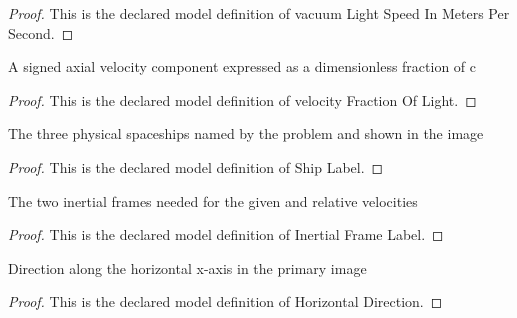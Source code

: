 \begin{proof}
  This is the declared model definition of vacuum Light Speed In Meters Per Second.
\end{proof}
\begin{definition}
  \label{def:physics:phyx-mini-0590:phyxminiproblems-problemphyxmini0590-velocityfractionoflight}
  A signed axial velocity component expressed as a dimensionless fraction of c
\end{definition}
\begin{proof}
  This is the declared model definition of velocity Fraction Of Light.
\end{proof}
\begin{definition}
  \label{def:physics:phyx-mini-0590:phyxminiproblems-problemphyxmini0590-shiplabel}
  The three physical spaceships named by the problem and shown in the image
\end{definition}
\begin{proof}
  This is the declared model definition of Ship Label.
\end{proof}
\begin{definition}
  \label{def:physics:phyx-mini-0590:phyxminiproblems-problemphyxmini0590-inertialframelabel}
  The two inertial frames needed for the given and relative velocities
\end{definition}
\begin{proof}
  This is the declared model definition of Inertial Frame Label.
\end{proof}
\begin{definition}
  \label{def:physics:phyx-mini-0590:phyxminiproblems-problemphyxmini0590-horizontaldirection}
  Direction along the horizontal x-axis in the primary image
\end{definition}
\begin{proof}
  This is the declared model definition of Horizontal Direction.
\end{proof}
